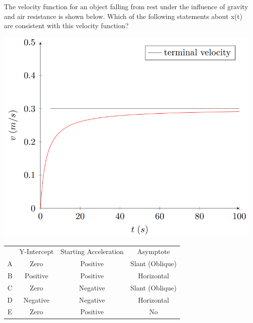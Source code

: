 \newpage
\begin{question}
The velocity function for an object falling from rest under the influence of gravity and air resistance is shown below. Which of the following statements about x(t) are consistent with this velocity function?





\includegraphics{Figures/Figure12}

\begin{tabular}{ |c|c|c|c| } 
 \hline
       & Y-Intercept & Starting Acceleration & Asymptote \\ 
 A     & Zero & Positive & Slant (Oblique)\\  
 B     & Positive & Positive & Horizontal\\ 
 C     & Zero & Negative & Slant (Oblique)\\ 
 D     & Negative & Negative & Horizontal\\ 
 E     & Zero & Positive & No\\ 
 \hline
\end{tabular}

\end{question}

